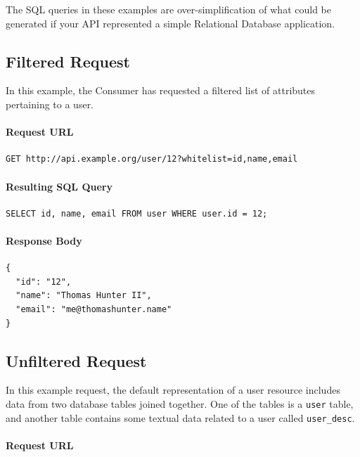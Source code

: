 \documentclass{book}
\begin{document}
The SQL queries in these examples are over-simplification of what could be generated if your API represented a simple Relational Database application.

\subsection{Filtered Request}

In this example, the Consumer has requested a filtered list of attributes pertaining to a user.

\paragraph{\textbf{Request URL}}

\begin{verbatim}
GET http://api.example.org/user/12?whitelist=id,name,email
\end{verbatim}

\paragraph{\textbf{Resulting SQL Query}}

\begin{verbatim}
SELECT id, name, email FROM user WHERE user.id = 12;
\end{verbatim}

\paragraph{\textbf{Response Body}}

\begin{verbatim}
{
  "id": "12",
  "name": "Thomas Hunter II",
  "email": "me@thomashunter.name"
}
\end{verbatim}

\subsection{Unfiltered Request}

In this example request, the default representation of a user resource includes data from two database tables joined together. One of the tables is a \texttt{user} table, and another table contains some textual data related to a user called \texttt{user\_desc}.

\paragraph{\textbf{Request URL}}
\end{document}
